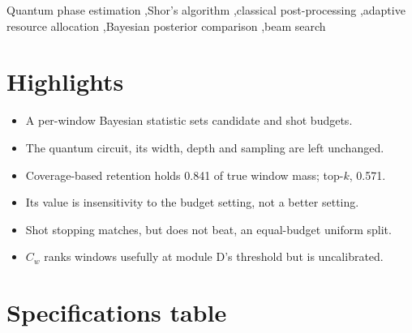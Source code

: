 \documentclass[final,5p,times,longtitle]{elsarticle}
\newcommand{\Cw}{C_w}
\begin{document}
\begin{frontmatter}
\begin{keyword}
Quantum phase estimation \sep Shor's algorithm \sep classical
post-processing \sep adaptive resource allocation \sep Bayesian posterior
comparison \sep beam search
\end{keyword}

\end{frontmatter}

\section*{Highlights}
\begin{itemize}\itemsep2pt
\item A per-window Bayesian statistic sets candidate and shot budgets.
\item The quantum circuit, its width, depth and sampling are left unchanged.
\item Coverage-based retention holds 0.841 of true window mass; top-$k$, 0.571.
\item Its value is insensitivity to the budget setting, not a better setting.
\item Shot stopping matches, but does not beat, an equal-budget uniform split.
\item $\Cw$ ranks windows usefully at module D's threshold but is uncalibrated.
\end{itemize}

\section*{Specifications table}
\end{document}
